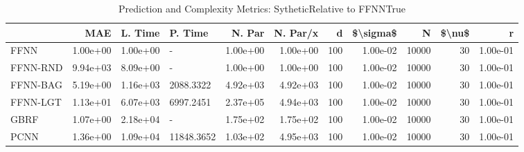\begin{table}
\centering
\caption{Prediction and Complexity Metrics: SytheticRelative to FFNNTrue}
\label{tab__Sythetic__Fix_Neurons_QTrue}
\begin{tabular}{lrrlrrrrrrr}
\toprule
{} &      MAE &  L. Time &     P. Time &   N. Par &  N. Par/x &    d &  \$\textbackslash sigma\$ &      N &  \$\textbackslash nu\$ &        r \\
\midrule
FFNN     & 1.00e+00 & 1.00e+00 &           - & 1.00e+00 &  1.00e+00 &  100 &  1.00e-02 &  10000 &     30 & 1.00e-01 \\
FFNN-RND & 9.94e+03 & 8.09e+00 &           - & 1.00e+00 &  1.00e+00 &  100 &  1.00e-02 &  10000 &     30 & 1.00e-01 \\
FFNN-BAG & 5.19e+00 & 1.16e+03 &   2088.3322 & 4.92e+03 &  4.92e+03 &  100 &  1.00e-02 &  10000 &     30 & 1.00e-01 \\
FFNN-LGT & 1.13e+01 & 6.07e+03 &   6997.2451 & 2.37e+05 &  4.94e+03 &  100 &  1.00e-02 &  10000 &     30 & 1.00e-01 \\
GBRF     & 1.07e+00 & 2.18e+04 &           - & 1.75e+02 &  1.75e+02 &  100 &  1.00e-02 &  10000 &     30 & 1.00e-01 \\
PCNN     & 1.36e+00 & 1.09e+04 &  11848.3652 & 1.03e+02 &  4.95e+03 &  100 &  1.00e-02 &  10000 &     30 & 1.00e-01 \\
\bottomrule
\end{tabular}
\end{table}
